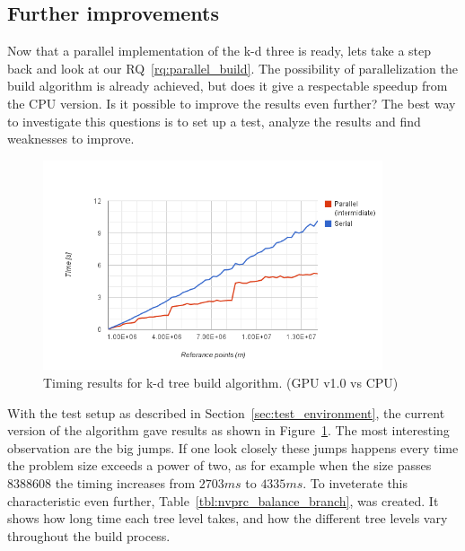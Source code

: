 




\subsection{Further improvements} %
\label{ssub:further_development}


Now that a parallel implementation of the k-d three is ready, lets take a step back and look at our RQ~\ref{rq:parallel_build}. The possibility of parallelization the build algorithm is already achieved, but does it give a respectable speedup from the CPU version. Is it possible to improve the results even further? The best way to investigate this questions is to set up a test, analyze the results and find weaknesses to improve.

\begin{figure}[ht!]
\centering
\includegraphics[width=100mm]{../gfx/the_jumps.png}

\caption{Timing results for k-d tree build algorithm. (GPU v1.0 vs CPU)}
\label{fig:gpuv1_vs_cpu}
\end{figure}


With the test setup as described in Section~\ref{sec:test_environment}, the current version of the algorithm gave results as shown in Figure~\ref{fig:gpuv1_vs_cpu}. The most interesting observation are the big jumps. If one look closely these jumps happens every time the problem size exceeds a power of two, as for example when the size passes 8388608 the timing increases from $2703 ms$ to $4335 ms$. To inveterate this characteristic even further, Table~\ref{tbl:nvprc_balance_branch}, was created. It shows how long time each tree level takes, and how the different tree levels vary throughout the build process.

